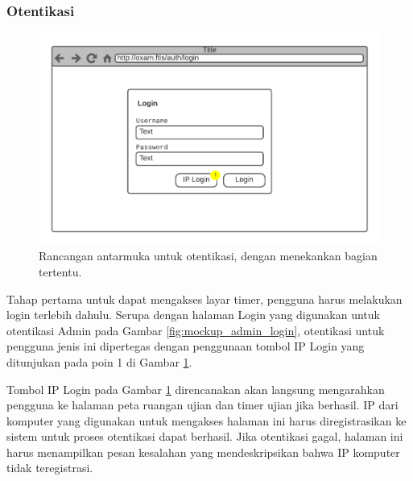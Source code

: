 \subsubsection{Otentikasi}
    \begin{figure}
        \centering
        \includegraphics[width=0.7\paperwidth]{Gambar/mockups/Mockup--DosenPengawas - Login.pdf}
        \caption{Rancangan antarmuka untuk otentikasi, dengan menekankan bagian tertentu.}
        \label{fig:mockup_dosen_login}
    \end{figure}
    Tahap pertama untuk dapat mengakses layar timer, pengguna harus melakukan
    login terlebih dahulu. Serupa dengan halaman Login yang digunakan untuk
    otentikasi Admin pada Gambar \ref{fig:mockup_admin_login}, otentikasi untuk
    pengguna jenis ini dipertegas dengan penggunaan tombol IP Login yang
    ditunjukan pada poin 1 di Gambar \ref{fig:mockup_dosen_login}.
    
    Tombol IP Login pada Gambar \ref{fig:mockup_dosen_login} direncanakan akan
    langsung mengarahkan pengguna ke halaman peta ruangan ujian dan timer ujian
    jika berhasil. IP dari komputer yang digunakan untuk mengakses halaman ini
    harus diregistrasikan ke sistem untuk proses otentikasi dapat berhasil. Jika
    otentikasi gagal, halaman ini harus menampilkan pesan kesalahan yang
    mendeskripsikan bahwa IP komputer tidak teregistrasi.
    

